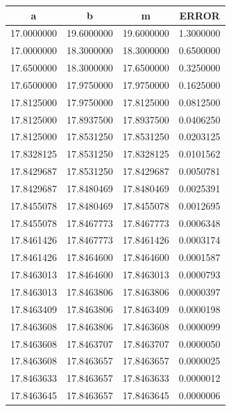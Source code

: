 \documentclass[12pt,a4paper]{article}
\begin{document}
\begin{tabular}{| c | c | c | c |}
\hline
a & b & m & ERROR \\ \hline
 17.0000000   &   19.6000000   &   19.6000000   &   1.3000000      \\
 17.0000000   &   18.3000000   &   18.3000000   &   0.6500000      \\
 17.6500000   &   18.3000000   &   17.6500000   &   0.3250000      \\
 17.6500000   &   17.9750000   &   17.9750000   &   0.1625000      \\
 17.8125000   &   17.9750000   &   17.8125000   &   0.0812500      \\
 17.8125000   &   17.8937500   &   17.8937500   &   0.0406250      \\
 17.8125000   &   17.8531250   &   17.8531250   &   0.0203125      \\
 17.8328125   &   17.8531250   &   17.8328125   &   0.0101562      \\
 17.8429687   &   17.8531250   &   17.8429687   &   0.0050781      \\
 17.8429687   &   17.8480469   &   17.8480469   &   0.0025391      \\
 17.8455078   &   17.8480469   &   17.8455078   &   0.0012695      \\
 17.8455078   &   17.8467773   &   17.8467773   &   0.0006348      \\
 17.8461426   &   17.8467773   &   17.8461426   &   0.0003174      \\
 17.8461426   &   17.8464600   &   17.8464600   &   0.0001587 		\\
 17.8463013   &   17.8464600   &   17.8463013   &   0.0000793  		 \\   
 17.8463013   &   17.8463806   &   17.8463806   &   0.0000397     \\ 
 17.8463409   &   17.8463806   &   17.8463409   &   0.0000198      \\
 17.8463608   &   17.8463806   &   17.8463608   &   0.0000099     \\ 
 17.8463608   &   17.8463707   &   17.8463707   &   0.0000050      \\
 17.8463608   &   17.8463657   &   17.8463657   &   0.0000025      \\
 17.8463633   &   17.8463657   &   17.8463633   &   0.0000012      \\
 17.8463645   &   17.8463657   &   17.8463645   &   0.0000006   \\   \hline
\end{tabular}
\newpage
\end{document}
